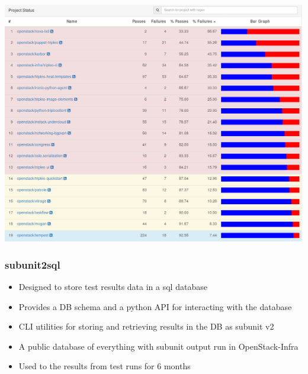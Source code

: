 \documentclass[aspectratio=169,11pt,hyperref={colorlinks=true}]{beamer}
\begin{document}
\begin{frame}
    \centering
    \includegraphics[height=\textheight]{o-h-project_fails.png}
\end{frame}

\begin{frame}
    \frametitle{subunit2sql}
    \begin{itemize}
        \item Designed to store test results data in a sql database
        \item Provides a DB schema and a python API for interacting with the
              database
        \item CLI utilities for storing and retrieving results in the DB as subunit v2
        \item A public database of everything with subunit output run in OpenStack-Infra
        \item Used to the results from test runs for 6 months
    \end{itemize}

\end{frame}

\end{document}
